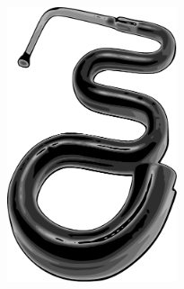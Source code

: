  \vfill
\begin{center}
 \includegraphics[width=5cm]{images/sem2.pdf}
\end{center}
 \vfill

 

\clearemptydoublepage